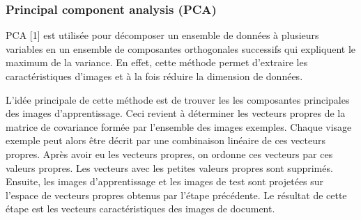 \documentclass[french,12pt,a4paper,oneside,notitlepage]{report}
\begin{document}
\subsubsection{Principal component analysis (PCA)}
PCA [1] est utilisée pour décomposer un ensemble de données à plusieurs variables en un 
ensemble de composantes orthogonales successifs qui expliquent le maximum de la variance. 
En effet, cette méthode permet d'extraire les caractéristiques d'images et à la fois 
réduire la dimension de données.

L'idée principale de cette méthode est de trouver les les composantes principales des 
images d'apprentissage. Ceci revient à déterminer les vecteurs propres de la matrice de 
covariance formée par l'ensemble des images exemples. Chaque visage exemple peut alors 
être décrit par une combinaison linéaire de ces vecteurs propres. Après avoir eu les 
vecteurs propres, on ordonne ces vecteurs par ces valeurs propres. Les vecteurs avec les 
petites valeurs propres sont supprimés. Ensuite, les images d'apprentissage et les images 
de test sont projetées sur l'espace de vecteurs propres obtenus par l'étape précédente. 
Le résultat de cette étape est les vecteurs caractéristiques des images de document.
\end{document}
